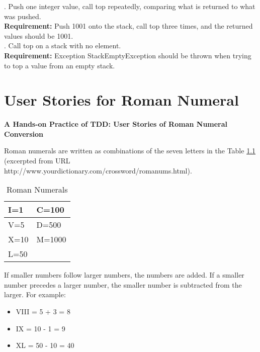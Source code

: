 . Push one integer value, call top repeatedly, comparing what is returned to what was pushed. \\
\textbf{Requirement:} Push 1001 onto the stack, call top three times, and the returned values should be 1001.\\

. Call top on a stack with no element. \\
\textbf{Requirement:} Exception StackEmptyException should be thrown when trying to top a value from an empty stack. 

\chapter{User Stories for Roman Numeral}
\label{app:UserStoriesRomanNumeral}

\clearpage
\begin{center}
\LARGE{\textbf{A Hands-on Practice of TDD: User Stories of Roman Numeral Conversion}}
\end{center}

Roman numerals are written as combinations of the seven letters in the
Table \ref{tab:AppRomanNumerals} (excerpted from URL 
http://www.yourdictionary.com/crossword/romanums.html).
\begin{table}[!h]
\centering
  \caption{Roman Numerals}\label{tab:AppRomanNumerals}  
  \begin{tabular}{|p{2cm}|p{2cm}|}
  \hline
    I=1  & C=100  \\ \hline
    V=5  & D=500  \\ \hline
    X=10 & M=1000 \\ \hline
    L=50 &        \\ 
  \hline
  \end{tabular}
\end{table}
If smaller numbers follow larger numbers, the numbers are added. If a
smaller number precedes a larger number, the smaller number is
subtracted from the larger. For example:
\begin{itemize}
\item VIII = 5 + 3 = 8
\item IX   = 10 - 1 = 9
\item XL   = 50 - 10 = 40
\end{itemize}

